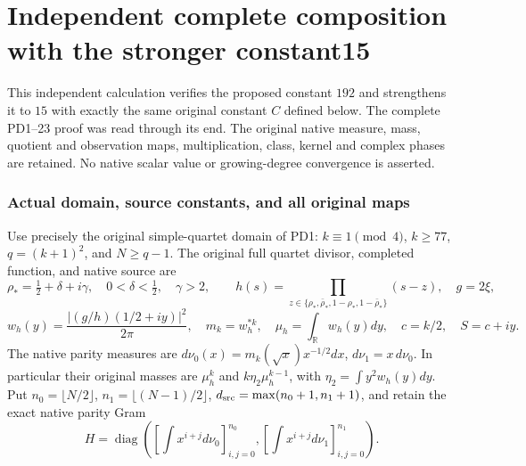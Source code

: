 \documentclass[11pt]{article}
\begin{document}
\endgroup

\clearpage\begingroup
\part*{Independent complete composition with the stronger constant15}
\newcommand{\mcindC}{\mathbb C}
\newcommand{\mcindtr}{\operatorname{tr}}
\newcommand{\mcinddiag}{\operatorname{diag}}
\newcommand{\mcindnorm}[1]{\left\lVert#1\right\rVert}


This independent calculation verifies the proposed constant $192$
and strengthens it to $15$ with exactly the same original constant
$C$ defined below. The complete PD1--23 proof \cite{mcind:PD} was read
through its end. The original native measure, mass, quotient and
observation maps, multiplication, class, kernel and complex phases
are retained. No native scalar value or growing-degree convergence
is asserted.

\section{Actual domain, source constants, and all original maps}

Use precisely the original simple-quartet domain of PD1:
$k\equiv1\pmod4$, $k\ge77$, $q=(k+1)^2$, and $N\ge q-1$.
The original full quartet divisor, completed function, and native
source are
\[
 \rho_*=\tfrac12+\delta+i\gamma,\quad0<\delta<\tfrac12,\quad\gamma>2,
 \qquad
 h(s)=\prod_{z\in\{\rho_*,\bar\rho_*,1-\rho_*,1-\bar\rho_*\}}(s-z),
 \quad g=2\xi,
\]
\[
 w_h(y)=\frac{|(g/h)(1/2+iy)|^2}{2\pi},\quad m_k=w_h^{*k},
 \quad \mu_h=\int_{\mathbb R}w_h(y)dy,\quad c=k/2,\quad S=c+iy.
\]
The native parity measures are
$d\nu_0(x)=m_k(\sqrt x)x^{-1/2}dx$, $d\nu_1=x\,d\nu_0$.
In particular their original masses are $\mu_h^k$ and
$k\eta_2\mu_h^{k-1}$, with $\eta_2=\int y^2w_h(y)dy$.
Put $n_0=\lfloor N/2\rfloor$, $n_1=\lfloor(N-1)/2\rfloor$,
$d_{\rm src}=\max(n_0+1,n_1+1)$, and retain the exact native
parity Gram
\begin{equation}\tag{MC1}\label{mcind:eq:H}
 H=\mcinddiag\left([\int x^{i+j}d\nu_0]_{i,j=0}^{n_0},
               [\int x^{i+j}d\nu_1]_{i,j=0}^{n_1}\right).
\end{equation}
\end{document}
